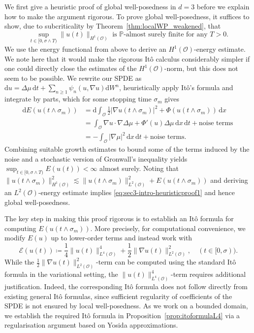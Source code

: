 \documentclass[reqno]{amsart}
\renewcommand{\P}{\mathbb{P}}
\newcommand{\sO}{\mathscr{O}}
\newcommand{\ce}{\coloneqq}
\newcommand{\1}{\mathbf{1}}
\newcommand{\grad}{\nabla}
\newcommand{\dt}{\,\mathrm{d}t}
\newcommand{\dx}{\,\mathrm{d}x}
\newcommand{\dd}{\ensuremath{\mathrm{d}}}
\begin{document}
    We first give a heuristic proof of global well-posedness in $d=3$ before
we explain how to make the argument rigorous. To prove global well-posedness, it
suffices to show, due to subcriticality by Theorem~\ref{thm:localWP_weakened},
that
    \begin{equation}\label{eq:sec3-intro-heuristicproof1}
     \sup_{t\in[0,\sigma\wedge T)} \|u(t)\|_{H^1(\sO)} \text{ is } \P \text{-almost
surely finite for any }T>0.
     \end{equation}
    We use the energy functional from above to derive an $H^1(\sO)$-energy estimate.
We note here that it would make the rigorous Itô calculus considerably simpler if one
could directly close the estimates of the $H^1(\sO)$-norm, but this does not seem to be
possible. We rewrite our SPDE as $\dd u = \Delta \mu \dt + \sum_{n\geq
1}\psi_n(u,\grad u) \dd W^n$, heuristically apply Itô's formula and integrate by
parts, which for some stopping time $\sigma_m$ gives
    \begin{equation*}
    \begin{aligned}
     \dd E(u(t\wedge \sigma_m)) & = \dd \int_\sO  \frac{1}{2}|\grad u(t\wedge \sigma_m)|^2
        + \Phi(u(t\wedge \sigma_m)) \dx \\
    & =  \int_{\sO} \grad u  \cdot \grad \Delta \mu  + \Phi'(u) \Delta \mu  \dx \dt
    + \text{noise terms}\ \\
    & = - \int_{\sO} |\grad  \mu|^2 \dx \dt + \text{noise terms}.
    \end{aligned}
    \end{equation*}
    Combining suitable growth estimates to bound some of the terms induced by the noise and
    a stochastic version of Gronwall's inequality yields $\sup_{t\in[0,\sigma\wedge
T)}E(u(t))< \infty$ almost surely. Noting that  $\|u(t\wedge
\sigma_m)\|^2_{H^1(\sO)} \lesssim \|u(t\wedge \sigma_m)\|^2_{L^2(\sO)} + E(u(t\wedge
\sigma_m))$ and deriving an $L^2(\sO)$-energy estimate implies
\eqref{eq:sec3-intro-heuristicproof1} and hence global well-posedness.


The key step in making this proof rigorous is to establish an Itô formula for 
computing $E(u(t\wedge\sigma_m))$. More precisely, for computational convenience, 
we modify $E(u)$ up to lower-order terms and instead work with
\[
\mathcal{E}(u(t))\ce\frac{1}{4}\|u(t)\|_{L^4(\sO)}^4 + \frac{1}{2}\|\grad u(t)\|_{L^2(\sO)}^2,\quad (t \in [0,\sigma)).
\]
While the $\frac{1}{2}\|\grad u(t)\|_{L^2(\sO)}^2$-term can be computed using the standard Itô formula in the variational setting, the $\|u(t)\|^4_{L^4(\sO)}$-term requires additional justification. Indeed, the corresponding Itô formula does not follow directly from existing general Itô formulas, since sufficient regularity of coefficients of the SPDE is not ensured by local well-posedness. As we work on a bounded domain, we establish the required Itô formula in Proposition~\ref{prop:itoformulaL4} via a regularisation argument based on Yosida approximations.
\end{document}
